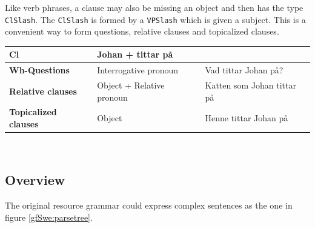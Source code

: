 \documentclass{report}
\begin{document}
Like verb phrases, a clause may also be missing an object and then has the type
\verb-ClSlash-. The \verb-ClSlash- is formed by a \verb-VPSlash- which is 
given a subject.
This is a convenient way to form questions, relative clauses
and topicalized clauses.\\

\begin{tabular}{|l|ll|}
\hline
\textbf{Cl}& Johan + tittar på \\
\hline
\textbf{Wh-Questions} & Interrogative pronoun   & Vad tittar Johan på?\\
\textbf{Relative clauses} & Object + Relative pronoun & Katten som Johan tittar på \\
\textbf{Topicalized clauses} & Object  & Henne tittar Johan på \\
\hline
\end{tabular}\\


%
%


\subsection{Overview}
\vspace{4mm}
The original resource grammar could express complex sentences
as the one in figure \ref{gfSwe:parsetree}.

\end{document}
